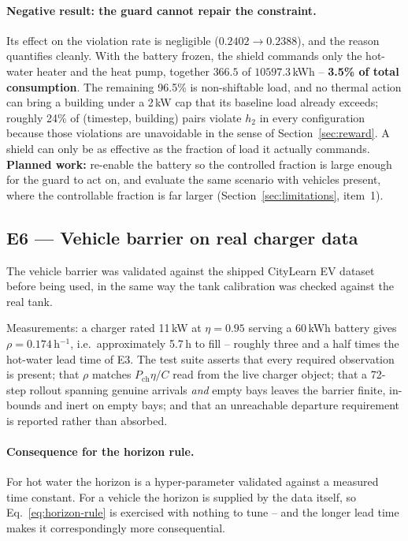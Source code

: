\documentclass[11pt]{article}
\begin{document}
\paragraph{Negative result: the guard cannot repair the constraint.} Its effect
on the violation rate is negligible ($0.2402 \to 0.2388$), and the reason
quantifies cleanly. With the battery frozen, the shield commands only the
hot-water heater and the heat pump, together $366.5$ of $10597.3$\,kWh --
\textbf{3.5\% of total consumption}. The remaining 96.5\% is non-shiftable load,
and no thermal action can bring a building under a 2\,kW cap that its baseline
load already exceeds; roughly 24\% of (timestep, building) pairs violate $h_2$ in
every configuration because those violations are unavoidable in the sense of
Section~\ref{sec:reward}. A shield can only be as effective as the fraction of
load it actually commands. \textbf{Planned work:} re-enable the battery so the
controlled fraction is large enough for the guard to act on, and evaluate the
same scenario with vehicles present, where the controllable fraction is far
larger (Section~\ref{sec:limitations}, item~1).

\subsection{E6 --- Vehicle barrier on real charger data}
\label{sec:exp-ev}

The vehicle barrier was validated against the shipped CityLearn EV dataset
before being used, in the same way the tank calibration was checked against the
real tank.

Measurements: a charger rated 11\,kW at $\eta = 0.95$ serving a 60\,kWh battery
gives $\rho = 0.174$\,h$^{-1}$, i.e.\ approximately 5.7\,h to fill -- roughly
three and a half times the hot-water lead time of E3. The test suite asserts
that every required observation is present; that $\rho$ matches
$P_{\text{ch}}\eta/C$ read from the live charger object; that a 72-step rollout
spanning genuine arrivals \emph{and} empty bays leaves the barrier finite,
in-bounds and inert on empty bays; and that an unreachable departure requirement
is reported rather than absorbed.

\paragraph{Consequence for the horizon rule.} For hot water the horizon is a
hyper-parameter validated against a measured time constant. For a vehicle the
horizon is supplied by the data itself, so Eq.~\ref{eq:horizon-rule} is exercised
with nothing to tune -- and the longer lead time makes it correspondingly more
consequential.
\end{document}
